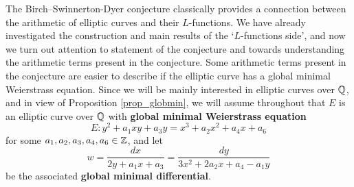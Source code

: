 The Birch--Swinnerton-Dyer conjecture classically provides a connection between the arithmetic of elliptic curves and their $L$-functions. We have already investigated the construction and main results of the `$L$-functions side', and now we turn out attention to statement of the conjecture and towards understanding the arithmetic terms present in the conjecture. Some arithmetic terms present in the conjecture are easier to describe if the elliptic curve has a global minimal Weierstrass equation. Since we will be mainly interested in elliptic curves over $\mathbb{Q}$, and in view of Proposition \ref*{prop_globmin}, we will assume throughout that $E$ is an elliptic curve over $\mathbb{Q}$ with \textbf{global minimal Weierstrass equation}
$$E:y^2+a_1xy+a_3y=x^3+a_2x^2+a_4x+a_6$$ 
for some $a_1,a_2,a_3,a_4,a_6\in\mathbb{Z}$, and let 
$$w=\frac{dx}{2y+a_1x+a_3}=\frac{dy}{3x^2+2a_2x+a_4-a_1y}$$
be the associated \textbf{global minimal differential}.



%

